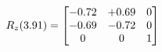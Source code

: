 \documentclass[preview]{standalone}
\begin{document}
\begin{align*}
\special{dvisvgm:raw <g id='unique000'>}R_{z}(3.91) = \begin{bmatrix}-0.72 & +0.69 & 0 \\-0.69 & -0.72 & 0 \\0 & 0 & 1\end{bmatrix}\special{dvisvgm:raw </g>}
\end{align*}
\end{document}
